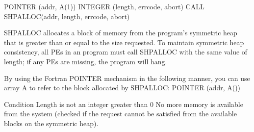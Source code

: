 
\synF   %

       POINTER (addr, A(1))
       INTEGER (length, errcode, abort)
       CALL SHPALLOC(addr, length, errcode, abort)

 {   
 SHPALLOC	 allocates a block of memory from the program's symmetric heap
       that is greater than or equal  to  the  size  requested.	  To  maintain
       symmetric  heap	consistency,  all  \ac{PE}s in an program must call SHPALLOC
       with the same value of length; if any  \ac{PE}s  are
       missing, the program will hang.
       
       By using the Fortran POINTER mechanism in the following manner, you can
       use array A to refer to the block allocated by SHPALLOC: POINTER (addr,
       A())
  }
{
{}
\desR{ }
 {Condition}
 {Length is not an integer greater than 0}
 { No more memory is available from the system (checked  if the  request  cannot  be	satisfied  from	 the available blocks on the symmetric heap).}
}%

\eAPI 
